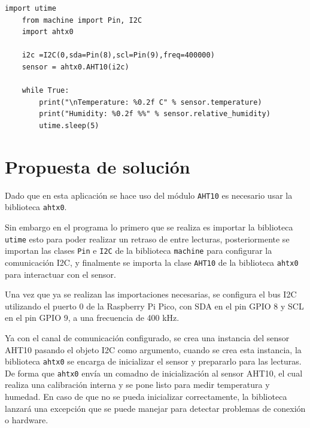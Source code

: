 \documentclass[letterpaper,12pt]{article}
\begin{document}
\begin{center}
{
        }
    \end{center}

    \begin{lstlisting}[basicstyle=\ttfamily\footnotesize,caption={Figura 10-15. Código de ejemplo; actividad 8}]
    import utime
    from machine import Pin, I2C
    import ahtx0

    i2c =I2C(0,sda=Pin(8),scl=Pin(9),freq=400000)
    sensor = ahtx0.AHT10(i2c)

    while True:
        print("\nTemperature: %0.2f C" % sensor.temperature)
        print("Humidity: %0.2f %%" % sensor.relative_humidity)
        utime.sleep(5)
    \end{lstlisting}
    \section*{Propuesta de solución}

    Dado que en esta aplicación se hace uso del módulo \texttt{AHT10} es necesario usar la biblioteca \texttt{ahtx0}.

    Sin embargo en el programa lo primero que se realiza es importar la biblioteca \texttt{utime} esto para poder realizar un retraso de entre lecturas, posteriormente se importan las clases \texttt{Pin} e \texttt{I2C} de la biblioteca \texttt{machine} para configurar la comunicación I2C, y finalmente se importa la clase \texttt{AHT10} de la biblioteca \texttt{ahtx0} para interactuar con el sensor.

    Una vez que ya se realizan las importaciones necesarias, se configura el bus I2C utilizando el puerto 0 de la Raspberry Pi Pico, con SDA en el pin GPIO 8 y SCL en el pin GPIO 9, a una frecuencia de 400 kHz. 

    Ya con el canal de comunicación configurado, se crea una instancia del sensor AHT10 pasando el objeto I2C como argumento, cuando se crea esta instancia, la biblioteca \texttt{ahtx0} se encarga de inicializar el sensor y prepararlo para las lecturas. De forma que \texttt{ahtx0} envía un comadno de inicialización al sensor AHT10, el cual realiza una calibración interna y se pone listo para medir temperatura y humedad. En caso de que no se pueda inicializar correctamente, la biblioteca lanzará una excepción que se puede manejar para detectar problemas de conexión o hardware.
\end{document}

